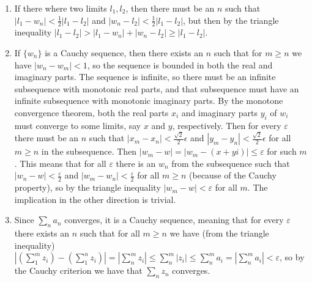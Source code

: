\documentclass{../note}
\begin{document}
\begin{solution}
\begin{enumerate}[label=(\alph*)]
    \item If there where two limits $l_1, l_2$, then there must be an $n$ such that $|l_1 - w_n| < \frac12|l_1 - l_2|$ and $|w_n - l_2| < \frac12|l_1 - l_2|$, but then by the triangle inequality $|l_1 - l_2| > |l_1 - w_n| + |w_n - l_2| \geq |l_1 - l_2|$.
    \item If $\{w_n\}$ is a Cauchy sequence, then there exists an $n$ such that for $m \geq n$ we have $|w_n - w_m| < 1$, so the sequence is bounded in both the real and imaginary parts. The sequence is infinite, so there must be an infinite subsequence with monotonic real parts, and that subsequence must have an infinite subsequence with monotonic imaginary parts. By the monotone convergence theorem, both the real parts $x_i$ and imaginary parts $y_i$ of $w_i$ must converge to some limits, say $x$ and $y$, respectively. Then for every $\varepsilon$ there must be an $n$ such that $|x_m - x_n| < \frac{\sqrt2}2 \epsilon$ and $|y_m - y_n| < \frac{\sqrt2}2 \epsilon$ for all $m \geq n$ in the subsequence. Then $|w_m - w| = |w_m - (x + yi)| \leq \varepsilon$ for such $m$. This means that for all $\varepsilon$ there is an $w_n$ from the subsequence such that $|w_n - w| < \frac\varepsilon2$ and $|w_m - w_n| < \frac\varepsilon2$ for all $m \geq n$ (because of the Cauchy property), so by the triangle inequality $|w_m - w| < \varepsilon$ for all $m$. The implication in the other direction is trivial.
    \item Since $\sum_n a_n$ converges, it is a Cauchy sequence, meaning that for every $\varepsilon$ there exists an $n$ such that for all $m \geq n$ we have (from the triangle inequality) $|(\sum_1^m z_i) - (\sum_1^n z_i)| = |\sum_n^m z_i| \leq \sum_n^m |z_i| \leq \sum_n^m a_i = |\sum_n^m a_i| < \varepsilon$, so by the Cauchy criterion we have that $\sum_n z_n$ converges.
\end{enumerate}
\end{solution}
\end{document}
